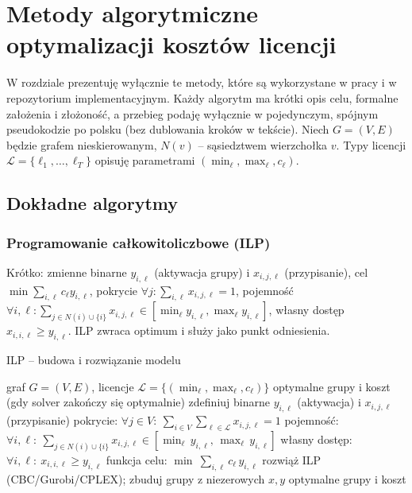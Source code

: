 \chapter{Metody algorytmiczne optymalizacji kosztów licencji}\label{chap:algorithms}

W rozdziale prezentuję wyłącznie te metody, które są wykorzystane w pracy i w repozytorium implementacyjnym. Każdy algorytm ma krótki opis celu, formalne założenia i złożoność, a przebieg podaję wyłącznie w pojedynczym, spójnym pseudokodzie po polsku (bez dublowania kroków w tekście). Niech $G=(V,E)$ będzie grafem nieskierowanym, $N(v)$ – sąsiedztwem wierzchołka $v$. Typy licencji $\mathcal{L}=\{\ell_1,\dots,\ell_T\}$ opisuję parametrami $(\min_\ell,\max_\ell,c_\ell)$.

\section{Dokładne algorytmy}

\subsection{Programowanie całkowitoliczbowe (ILP)}

Krótko: zmienne binarne $y_{i,\ell}$ (aktywacja grupy) i $x_{i,j,\ell}$ (przypisanie), cel $\min\sum_{i,\ell}c_\ell y_{i,\ell}$, pokrycie $\forall j:\sum_{i,\ell}x_{i,j,\ell}=1$, pojemność $\forall i,\ell:\sum_{j\in N(i)\cup\{i\}}x_{i,j,\ell}\in[\min_\ell y_{i,\ell},\max_\ell y_{i,\ell}]$, własny dostęp $x_{i,i,\ell}\ge y_{i,\ell}$. ILP zwraca optimum i służy jako punkt odniesienia.


\begin{algorithm}[H]
\caption{ILP – budowa i rozwiązanie modelu}
\label{alg:ilp}
\begin{algorithmic}[1]
\Require graf $G=(V,E)$, licencje $\mathcal{L}=\{(\min_\ell,\max_\ell,c_\ell)\}$
\Ensure optymalne grupy i koszt (gdy solver zakończy się optymalnie)
\State zdefiniuj binarne $y_{i,\ell}$ (aktywacja) i $x_{i,j,\ell}$ (przypisanie)
\State pokrycie: $\forall j\in V:\ \sum_{i\in V}\sum_{\ell\in\mathcal{L}} x_{i,j,\ell}=1$
\State pojemność: \(\forall i,\ell:\ \sum_{j\in N(i)\cup\{i\}} x_{i,j,\ell}\in[\min_\ell\,y_{i,\ell},\,\max_\ell\,y_{i,\ell}]\)
\State własny dostęp: \(\forall i,\ell:\ x_{i,i,\ell}\ge y_{i,\ell}\)
\State funkcja celu: \(\min\ \sum_{i,\ell} c_\ell\,y_{i,\ell}\)
\State rozwiąż ILP (CBC/Gurobi/CPLEX); zbuduj grupy z niezerowych \(x,y\)
\State \Return optymalne grupy i koszt
\end{algorithmic}
\end{algorithm}



